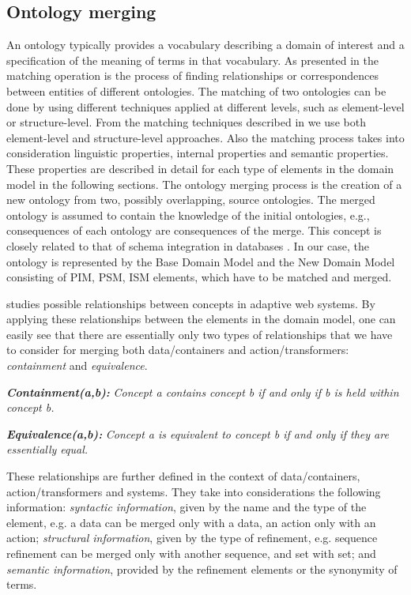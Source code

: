 \documentclass{sig-alternate}
\begin{document}
\subsection{Ontology merging}
An ontology typically provides a vocabulary describing a domain of interest and a specification of the meaning of terms in that vocabulary.
As presented in \cite{book1} the matching operation is the process of finding relationships or correspondences between entities of different ontologies.
The matching of two ontologies can be done by using different techniques applied at different levels, such as element-level or structure-level.
From the matching techniques described in \cite{book1} we use both element-level and structure-level approaches.
Also the matching process takes into consideration linguistic properties, internal properties and semantic properties.
These properties are described in detail for each type of elements in the domain model in the following sections.
The ontology merging process is the creation of a new ontology from two, possibly overlapping, source ontologies. 
The merged ontology is assumed to contain the knowledge of the initial ontologies, e.g., consequences of each ontology are consequences of the merge. 
This concept is closely related to that of schema integration in databases \cite{book1}. 
In our case, the ontology is represented by the Base Domain Model and the New Domain Model consisting of PIM, PSM, ISM elements,
which have to be matched and merged.

\cite{proceeding11} studies possible relationships between concepts in adaptive web systems.
By applying these relationships between the elements in the domain model, one can easily see that there are essentially only two types of relationships
that we have to consider for merging both data/containers and action/transformers: \textit{containment} and \textit{equivalence}. 

\textbf{\textit{Containment(a,b):}} \textit{Concept a contains concept b if and only if b is held within concept b.}

\textbf{\textit{Equivalence(a,b):}} \textit{Concept a is equivalent to concept b if and only if they are essentially equal.}

These relationships are further defined in the context of data/containers, action/transformers and systems.
They take into considerations the following information: 
\textit{syntactic information}, given by the name and the type of the element, e.g. a data can be merged only with a data, an action only with an action;
\textit{structural information}, given by the type of refinement, e.g. sequence refinement can be merged only with another sequence, and set with set; 
and \textit{semantic information}, provided by the refinement elements or the synonymity of terms. 
 
\end{document}

